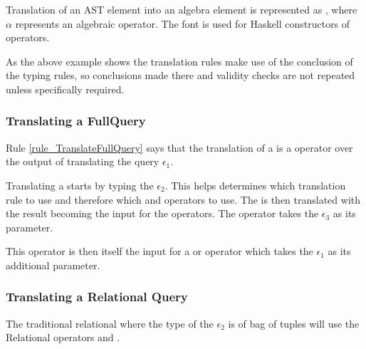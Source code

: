 Translation of an AST element into an algebra element is represented as \tranof{$\epsilon$}{$\alpha$}, where $\alpha$ represents an algebraic operator. The font  is used for Haskell constructors of operators. 

As the above example shows the translation rules make use of the conclusion of the typing rules, so conclusions made there and validity checks are not repeated unless specifically required.

\setcounter{equation}{\value{equation2}}
%

\subsubsection{Translating a FullQuery}
Rule \ref{rule_TranslateFullQuery} says that the translation of a  is a  operator over the output of translating the query $\epsilon_1$. 


Translating a  starts by typing the  $\epsilon_2$.
This helps determines which translation rule to use and therefore which  and  operators to use.
The  is then translated with the result becoming the input for the  operators.
The  operator takes the  $\epsilon_3$ as its parameter. 

This  operator is then itself the input for a  or  operator which takes the  $\epsilon_1$ as its additional parameter. 

\subsubsection{Translating a Relational Query}

The traditional relational  where the type of the  $\epsilon_2$ is of bag of tuples will use the Relational operators  and .


